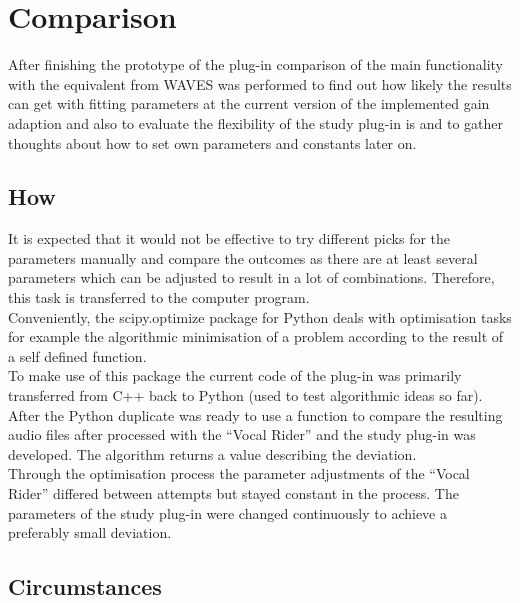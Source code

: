 \chapter{Comparison}
\label{chapter:comparison}

After finishing the prototype of the plug-in comparison of the main functionality with the equivalent from WAVES was performed to find out how likely the results can get with fitting parameters at the current version of the implemented gain adaption and also to evaluate the flexibility of the study plug-in is and to gather thoughts about how to set own parameters and constants later on.\\

\section{How}

It is expected that it would not be effective to try different picks for the parameters manually and compare the outcomes as there are at least several parameters which can be adjusted to result in a lot of combinations. Therefore, this task is transferred to the computer program.\\
Conveniently, the scipy.optimize package for Python deals with optimisation tasks for example the algorithmic minimisation of a problem according to the result of a self defined function.\\
To make use of this package the current code of the plug-in was primarily transferred from C++ back to Python (used to test algorithmic ideas so far). After the Python duplicate was ready to use a function to compare the resulting audio files after processed with the “Vocal Rider” and the study plug-in was developed. The algorithm returns a value describing the deviation.\\
Through the optimisation process the parameter adjustments of the “Vocal Rider” differed between attempts but stayed constant in the process. The parameters of the study plug-in were changed continuously to achieve a preferably small deviation.\\

\section{Circumstances}

